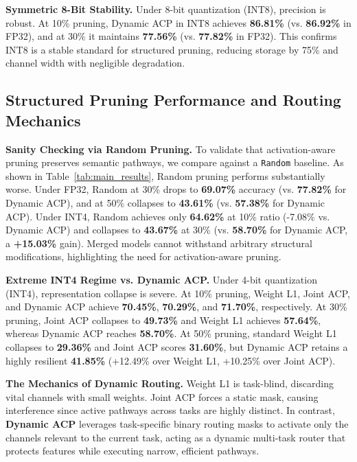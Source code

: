 \documentclass{article}
\theoremstyle{plain}
\theoremstyle{definition}
\theoremstyle{remark}
\begin{document}
\textbf{Symmetric 8-Bit Stability.} Under 8-bit quantization (INT8), precision is robust. At 10\% pruning, Dynamic ACP in INT8 achieves \textbf{86.81\%} (vs. \textbf{86.92\%} in FP32), and at 30\% it maintains \textbf{77.56\%} (vs. \textbf{77.82\%} in FP32). This confirms INT8 is a stable standard for structured pruning, reducing storage by 75\% and channel width with negligible degradation.

\subsection{Structured Pruning Performance and Routing Mechanics}
\textbf{Sanity Checking via Random Pruning.} To validate that activation-aware pruning preserves semantic pathways, we compare against a \texttt{Random} baseline. As shown in Table~\ref{tab:main_results}, Random pruning performs substantially worse. Under FP32, Random at 30\% drops to \textbf{69.07\%} accuracy (vs. \textbf{77.82\%} for Dynamic ACP), and at 50\% collapses to \textbf{43.61\%} (vs. \textbf{57.38\%} for Dynamic ACP). Under INT4, Random achieves only \textbf{64.62\%} at 10\% ratio (-7.08\% vs. Dynamic ACP) and collapses to \textbf{43.67\%} at 30\% (vs. \textbf{58.70\%} for Dynamic ACP, a \textbf{+15.03\%} gain). Merged models cannot withstand arbitrary structural modifications, highlighting the need for activation-aware pruning.

\textbf{Extreme INT4 Regime vs. Dynamic ACP.} Under 4-bit quantization (INT4), representation collapse is severe. At 10\% pruning, Weight L1, Joint ACP, and Dynamic ACP achieve \textbf{70.45\%}, \textbf{70.29\%}, and \textbf{71.70\%}, respectively. At 30\% pruning, Joint ACP collapses to \textbf{49.73\%} and Weight L1 achieves \textbf{57.64\%}, whereas Dynamic ACP reaches \textbf{58.70\%}. At 50\% pruning, standard Weight L1 collapses to \textbf{29.36\%} and Joint ACP scores \textbf{31.60\%}, but Dynamic ACP retains a highly resilient \textbf{41.85\%} (+12.49\% over Weight L1, +10.25\% over Joint ACP).

\textbf{The Mechanics of Dynamic Routing.} Weight L1 is task-blind, discarding vital channels with small weights. Joint ACP forces a static mask, causing interference since active pathways across tasks are highly distinct. In contrast, \textbf{Dynamic ACP} leverages task-specific binary routing masks to activate only the channels relevant to the current task, acting as a dynamic multi-task router that protects features while executing narrow, efficient pathways.
\end{document}
